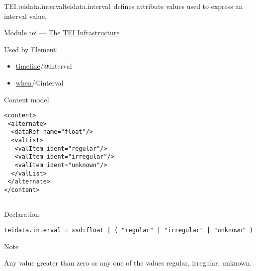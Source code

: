 \begin{reflist}
\item[]\begin{specHead}{TEI.teidata.interval}{teidata.interval} defines attribute values used to express an interval value.\end{specHead} 
    \item[{Module}]
  tei — \hyperref[ST]{The TEI Infrastructure}
    \item[{Used by}]
  Element: \begin{itemize}
\item \hyperref[TEI.timeline]{timeline}/@interval
\item \hyperref[TEI.when]{when}/@interval
\end{itemize} 
    \item[{Content model}]
  \mbox{}\hfill\\[-10pt]\begin{Verbatim}[fontsize=\small]
<content>
 <alternate>
  <dataRef name="float"/>
  <valList>
   <valItem ident="regular"/>
   <valItem ident="irregular"/>
   <valItem ident="unknown"/>
  </valList>
 </alternate>
</content>
    
\end{Verbatim}

    \item[{Declaration}]
  \mbox{}\hfill\\[-10pt]\begin{Verbatim}[fontsize=\small]
teidata.interval = xsd:float | ( "regular" | "irregular" | "unknown" )
\end{Verbatim}

    \item[{Note}]
  \par
Any value greater than zero or any one of the values regular, irregular, unknown.
\end{reflist}  
